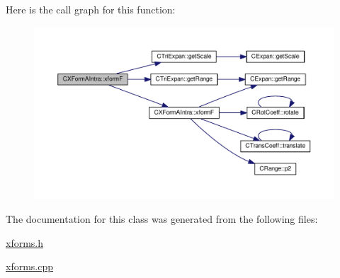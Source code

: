 Here is the call graph for this function\-:\nopagebreak
\begin{figure}[H]
\begin{center}
\leavevmode
\includegraphics[width=350pt]{classCXFormAIntra_ad9c2a0dcde81751a71e49fb92d31919b_cgraph}
\end{center}
\end{figure}




The documentation for this class was generated from the following files\-:\begin{DoxyCompactItemize}
\item 
\hyperlink{xforms_8h}{xforms.\-h}\item 
\hyperlink{xforms_8cpp}{xforms.\-cpp}\end{DoxyCompactItemize}
